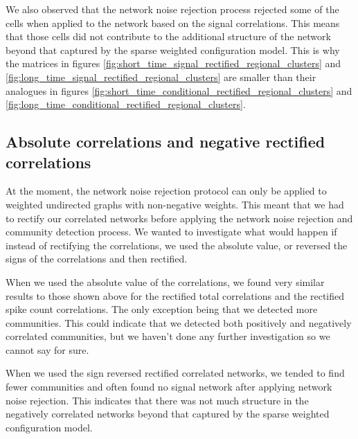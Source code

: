   We also observed that the network noise rejection process rejected some of the cells when applied to the network based on the signal correlations. This means that those cells did not contribute to the additional structure of the network beyond that captured by the sparse weighted configuration model. This is why the matrices in figures \ref{fig:short_time_signal_rectified_regional_clusters} and \ref{fig:long_time_signal_rectified_regional_clusters} are smaller than their analogues in figures \ref{fig:short_time_conditional_rectified_regional_clusters} and \ref{fig:long_time_conditional_rectified_regional_clusters}.


  \subsection{Absolute correlations and negative rectified correlations}
  At the moment, the network noise rejection protocol can only be applied to weighted undirected graphs with non-negative weights. This meant that we had to rectify our correlated networks before applying the network noise rejection and community detection process. We wanted to investigate what would happen if instead of rectifying the correlations, we used the absolute value, or reversed the signs of the correlations and then rectified.

  When we used the absolute value of the correlations, we found very similar results to those shown above for the rectified total correlations and the rectified spike count correlations. The only exception being that we detected more communities. This could indicate that we detected both positively and negatively correlated communities, but we haven't done any further investigation so we cannot say for sure.

  When we used the sign reversed rectified correlated networks, we tended to find fewer communities and often found no signal network after applying network noise rejection. This indicates that there was not much structure in the negatively correlated networks beyond that captured by the sparse weighted configuration model.

